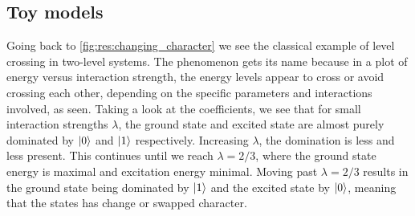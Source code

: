 \label{sec:discussion}
\subsection{Toy models}
Going back to \cref{fig:res:changing_character} we see the classical example of level crossing in two-level systems. The phenomenon gets its name because in a plot of energy versus interaction strength, the energy levels appear to cross or avoid crossing each other, depending on the specific parameters and interactions involved, as seen. Taking a look at the coefficients, we see that for small interaction strengths $\lambda$, the ground state and excited state are almost purely dominated by $\ket{0}$ and $\ket{1}$ respectively. Increasing $\lambda$, the domination is less and less present. This continues until we reach $\lambda = 2/3$, where the ground state energy is maximal and excitation energy minimal. Moving past  $\lambda = 2/3$ results in the ground state being dominated by $\ket{1}$ and the excited state by $\ket{0}$, meaning that the states has change or swapped character.

